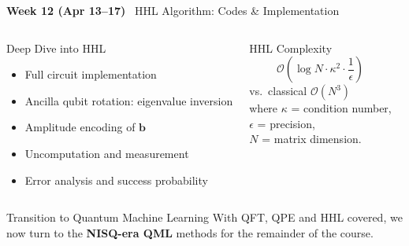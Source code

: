 \documentclass[aspectratio=169,12pt]{beamer}
\newcommand{\week}[1]{\textcolor{qgold}{\textbf{#1}}}
\begin{document}
\begin{frame}{\week{Week 12 (Apr 13--17)} \ HHL Algorithm: Codes \& Implementation}
  \begin{columns}[T]
      \begin{block}{Deep Dive into HHL}
        \begin{itemize}
          \item Full circuit implementation
          \item Ancilla qubit rotation: eigenvalue inversion
          \item Amplitude encoding of $\bm{b}$
          \item Uncomputation and measurement
          \item Error analysis and success probability
        \end{itemize}
      \end{block}
      \begin{alertblock}{HHL Complexity}
        \[
          \mathcal{O}\!\left(\log N \cdot \kappa^2 \cdot \frac{1}{\epsilon}\right)
        \]
        vs.\ classical $\mathcal{O}(N^3)$\\[4pt]
        where $\kappa$ = condition number,\\
        $\epsilon$ = precision,\\
        $N$ = matrix dimension.
      \end{alertblock}
    \end{columns}
    \vspace{4pt}
    \begin{block}{Transition to Quantum Machine Learning}
      With QFT, QPE and HHL covered, we now turn to the
      \textbf{NISQ-era QML} methods for the remainder of the course.
    \end{block}
\end{frame}
\end{document}
